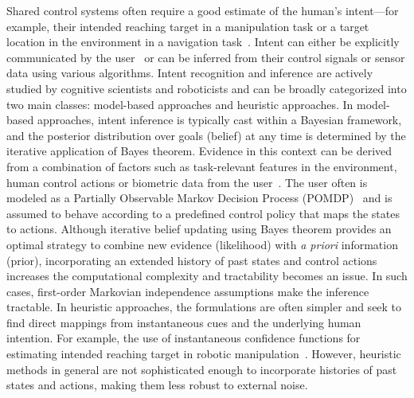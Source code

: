 \documentclass[natbib, twocolumn]{svjour3}          %
\begin{document}
Shared control systems often require a good estimate of the human's intent---for example, their intended reaching target in a manipulation task or a target location in the environment in a navigation task~\citep{liu2016goal}. Intent can either be explicitly communicated by the user~\citep{choi2008laser} or can be inferred from their control signals or sensor data using various algorithms. Intent recognition and inference are actively studied by cognitive scientists and roboticists and can be broadly categorized into two main classes: model-based approaches and heuristic approaches. In model-based approaches, intent inference is typically cast within a Bayesian framework, and the posterior distribution over goals (belief) at any time is determined by the iterative application of Bayes theorem. Evidence in this context can be derived from a combination of factors such as task-relevant features in the environment, human control actions or biometric data from the user~\citep{baker2007goal, baker2009action}. The user often is modeled as a Partially Observable Markov Decision Process (POMDP)~\citep{taha2011pomdp} and is assumed to behave according to a predefined control policy that maps the states to actions. Although iterative belief updating using Bayes theorem provides an optimal strategy to combine new evidence (likelihood) with \textit{a priori} information (prior), incorporating an extended history of past states and control actions increases the computational complexity and tractability becomes an issue. In such cases, first-order Markovian independence assumptions make the inference tractable. In heuristic approaches, the formulations are often simpler and seek to find direct mappings from instantaneous cues and the underlying human intention. For example, the use of instantaneous confidence functions for estimating intended reaching target in robotic manipulation~\citep{dragan2012assistive, gopinath2017human}.  However, heuristic methods in general are not sophisticated enough to incorporate histories of past states and actions, making them less robust to external noise. 
\end{document}
